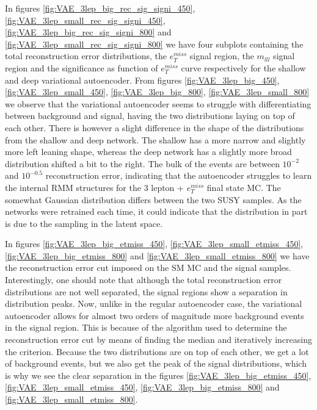 In figures \ref{fig:VAE_3lep_big_rec_sig_signi_450}, \ref{fig:VAE_3lep_small_rec_sig_signi_450}, 
\ref{fig:VAE_3lep_big_rec_sig_signi_800} and \ref{fig:VAE_3lep_small_rec_sig_signi_800} we have four 
subplots containing the total reconstruction error distributions, the $e_T^{miss}$ signal region, 
the $m_{lll}$ signal region and the significance as function of $e_T^{miss}$ curve respectively for 
the shallow and deep variational autoencoder. From figures \ref{fig:VAE_3lep_big_450}, \ref{fig:VAE_3lep_small_450},
\ref{fig:VAE_3lep_big_800}, \ref{fig:VAE_3lep_small_800} we observe that the variational 
autoencoder seems to struggle with differentiating between background and signal, having the 
two distributions laying on top of each other. There is however a slight difference in the 
shape of the distributions from the shallow and deep network. The shallow has a more narrow 
and slightly more left leaning shape, whereas the deep network has a slightly more broad 
distribution shifted a bit to the right. The bulk of the events are between $10^{-2}$ and $10^{-0.5}$ 
reconstruction error, indicating that the autoencoder struggles to learn  the internal RMM 
structures for the 3 lepton + $e_T^{miss}$ final state MC. The somewhat Gaussian distribution 
differs between the two SUSY samples. As the networks were retrained each time, it could indicate 
that the distribution in part is due to the sampling in the latent space. \par 

In figures \ref{fig:VAE_3lep_big_etmiss_450}, \ref{fig:VAE_3lep_small_etmiss_450}, 
\ref{fig:VAE_3lep_big_etmiss_800} and  \ref{fig:VAE_3lep_small_etmiss_800} we have the 
reconstruction error cut imposed on the SM MC and the signal samples. Interestingly, one should 
note that although the total reconstruction error distributions are not well separated, the 
signal regions show a separation in distribution peaks. Now, unlike in the regular autoencoder 
case, the variational autoencoder allows for almost two orders of magnitude more background 
events in the signal region.  This is because of the algorithm used to determine the 
reconstruction error cut by means of finding the median and iteratively increasing the criterion. 
Because the two distributions are on top of each other, we get a lot of background events, 
but we also get the peak of the signal distributions, which is why we see the clear 
separation in the figures \ref{fig:VAE_3lep_big_etmiss_450}, \ref{fig:VAE_3lep_small_etmiss_450}, 
\ref{fig:VAE_3lep_big_etmiss_800} and \ref{fig:VAE_3lep_small_etmiss_800}. \par 

